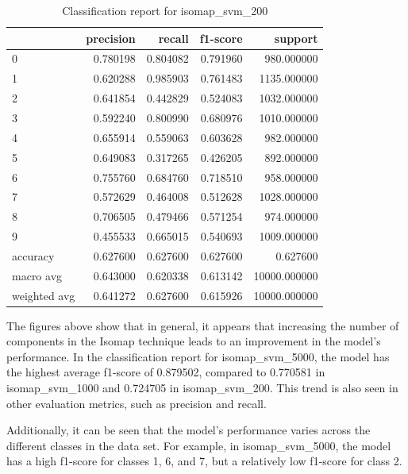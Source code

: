         \begin{table}[htb!]
            \centering
            \begin{tabular}{lrrrr}
                \toprule
                & precision & recall & f1-score & support \\
                \midrule
                0 & 0.780198 & 0.804082 & 0.791960 & 980.000000 \\
                1 & 0.620288 & 0.985903 & 0.761483 & 1135.000000 \\
                2 & 0.641854 & 0.442829 & 0.524083 & 1032.000000 \\
                3 & 0.592240 & 0.800990 & 0.680976 & 1010.000000 \\
                4 & 0.655914 & 0.559063 & 0.603628 & 982.000000 \\
                5 & 0.649083 & 0.317265 & 0.426205 & 892.000000 \\
                6 & 0.755760 & 0.684760 & 0.718510 & 958.000000 \\
            7 & 0.572629 & 0.464008 & 0.512628 & 1028.000000 \\
            8 & 0.706505 & 0.479466 & 0.571254 & 974.000000 \\
            9 & 0.455533 & 0.665015 & 0.540693 & 1009.000000 \\
            accuracy & 0.627600 & 0.627600 & 0.627600 & 0.627600 \\
            macro avg & 0.643000 & 0.620338 & 0.613142 & 10000.000000 \\
            weighted avg & 0.641272 & 0.627600 & 0.615926 & 10000.000000 \\
            \bottomrule
        \end{tabular}
        \caption{Classification report for isomap\_svm\_200}
        \label{tab:classification-report-isomap_svm_200}
    \end{table}
    
    The figures above show that in general, it appears that increasing the number of components in the Isomap technique leads to an improvement in the model's performance. In the classification report for isomap\_svm\_5000, the model has the highest average f1-score of 0.879502, compared to 0.770581 in isomap\_svm\_1000 and 0.724705 in isomap\_svm\_200. This trend is also seen in other evaluation metrics, such as precision and recall.
    
Additionally, it can be  seen that the model's performance varies across the different classes in the data set. For example, in isomap\_svm\_5000, the model has a high f1-score for classes 1, 6, and 7, but a relatively low f1-score for class 2.


